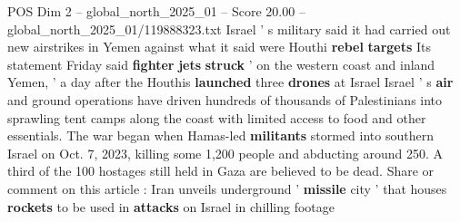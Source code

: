 \begin{textsample}{POS Dim 2 – global\_north\_2025\_01 – Score 20.00 – global\_north\_2025\_01/119888323.txt}
Israel ' s military said it had carried out new airstrikes in Yemen against what it said were Houthi \textbf{rebel} \textbf{targets} Its statement Friday said \textbf{fighter} \textbf{jets} \textbf{struck} ' on the western coast and inland Yemen, ' a day after the Houthis \textbf{launched} three \textbf{drones} at Israel Israel ' s \textbf{air} and ground operations have driven hundreds of thousands of Palestinians into sprawling tent camps along the coast with limited access to food and other essentials.
The war began when Hamas-led \textbf{militants} stormed into southern Israel on Oct. 7, 2023, killing some 1,200 people and abducting around 250.
A third of the 100 hostages still held in Gaza are believed to be dead.
Share or comment on this article : Iran unveils underground ' \textbf{missile} city ' that houses \textbf{rockets} to be used in \textbf{attacks} on Israel in chilling footage

\end{textsample}
